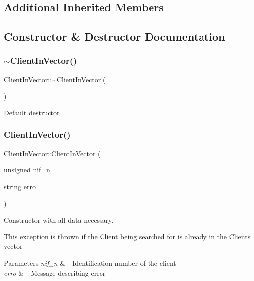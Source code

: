 \subsection*{Additional Inherited Members}


\subsection{Constructor \& Destructor Documentation}
\mbox{\label{class_client_in_vector_aa5187e63a59d3340d1287d7a91b4106a}} 
\subsubsection{\texorpdfstring{$\sim$\+Client\+In\+Vector()}{~ClientInVector()}}
{\footnotesize\ttfamily Client\+In\+Vector\+::$\sim$\+Client\+In\+Vector (\begin{DoxyParamCaption}{ }\end{DoxyParamCaption})}

Default destructor \mbox{\label{class_client_in_vector_a10ec0356f39e99be9205d5c0f6897652}} 
\subsubsection{\texorpdfstring{Client\+In\+Vector()}{ClientInVector()}}
{\footnotesize\ttfamily Client\+In\+Vector\+::\+Client\+In\+Vector (\begin{DoxyParamCaption}\item[{unsigned}]{nif\+\_\+n,  }\item[{string}]{erro }\end{DoxyParamCaption})\hspace{0.3cm}{\ttfamily [inline]}}



Constructor with all data necessary. 

This exception is thrown if the \hyperlink{class_client}{Client} being searched for is already in the Clients vector


\begin{DoxyParams}{Parameters}
{\em nif\+\_\+n} & -\/ Identification number of the client \\
\hline
{\em erro} & -\/ Message describing error \\
\hline
\end{DoxyParams}


